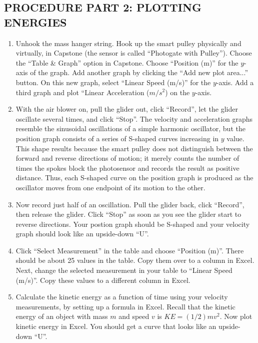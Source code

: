 \subsection*{PROCEDURE PART 2: PLOTTING ENERGIES}

\begin{enumerate}[label=\arabic*.]

\item Unhook the mass hanger string. Hook up the smart pulley physically and virtually, in Capstone (the sensor is called ``Photogate with Pulley'').  Choose the ``Table \& Graph'' option in Capstone.  Choose ``Position (m)'' for the \(y\)-axis of the graph.  Add another graph by clicking the ``Add new plot area...'' button.  On this new graph, select ``Linear Speed (m/s)'' for the \(y\)-axis.  Add a third graph and plot ``Linear Acceleration ($m/s^2$) on the \(y\)-axis.

\item With the air blower on, pull the glider out, click ``Record'', let the glider oscillate several times, and click ``Stop''.  The velocity and acceleration graphs resemble the sinusoidal oscillations of a simple harmonic oscillator, but the position graph consists of a series of S-shaped curves increasing in \(y\) value.  This shape results because the smart pulley does not distinguish between the forward and reverse directions of motion; it merely counts the number of times the spokes block the photosensor and records the result as positive distance.  Thus, each S-shaped curve on the position graph is produced as the oscillator moves from one endpoint of its motion to the other.

\item Now record just half of an oscillation.  Pull the glider back, click ``Record'', then release the glider.  Click ``Stop'' as soon as you see the glider start to reverse directions.  Your postion graph should be S-shaped and your velocity graph should look like an upside-down ``U''.

\item Click ``Select Measurement'' in the table and choose ``Position (m)''.  There should be about 25 values in the table.  Copy them over to a column in Excel.  Next, change the selected measurement in your table to ``Linear Speed (m/s)''.  Copy these values to a different column in Excel.

\item 
	Calculate the kinetic energy as a function of time using your velocity
	measurements, by setting up a formula in Excel.
	Recall that the kinetic energy of an object with mass $m$ and speed $v$
	is $KE=(1/2)mv^2$.
	Now plot kinetic energy in Excel.  
	You should get a curve that looks like an upside-down ``U''.


\end{enumerate}
